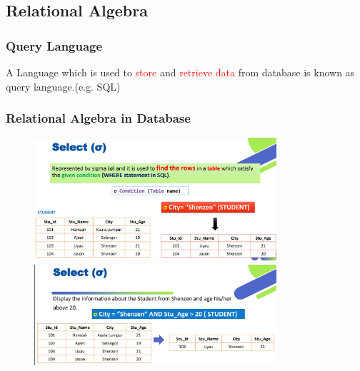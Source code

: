 \documentclass[a4paper, 12pt]{article}
\begin{document}
    \subsection{Relational Algebra}
    \subsubsection{Query Language}
    A Language which is used to \textcolor{red}{store} and \textcolor{red}{retrieve data} from
    database is known as query language.(e.g. SQL)
    \subsubsection{Relational Algebra in Database}
    \begin{figure}[H]
        \includegraphics[width=0.8\textwidth]{chapter1a_7.png}
        \includegraphics[width=0.8\textwidth]{chapter1a_8.png}
    \end{figure}
\end{document}
